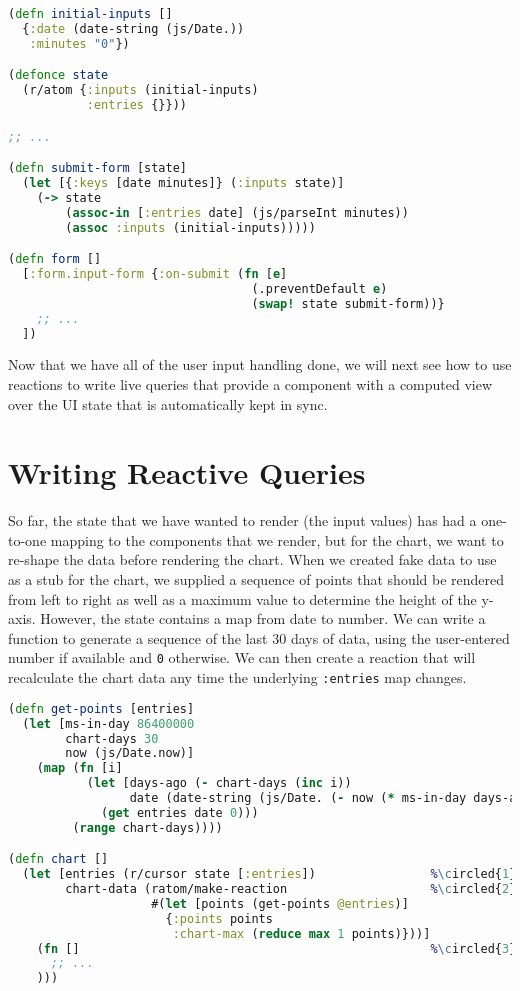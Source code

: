 \documentclass[10pt,twoside,openright]{memoir}
\newcommand*\circled[1]{\tikz[baseline=(char.base)]{
            \node[shape=circle,draw,inner sep=1pt] (char) {#1};}}
\begin{document}
\begin{lstlisting}[language=Clojure]
(defn initial-inputs []
  {:date (date-string (js/Date.))
   :minutes "0"})

(defonce state
  (r/atom {:inputs (initial-inputs)
           :entries {}}))

;; ...

(defn submit-form [state]
  (let [{:keys [date minutes]} (:inputs state)]
    (-> state
        (assoc-in [:entries date] (js/parseInt minutes))
        (assoc :inputs (initial-inputs)))))

(defn form []
  [:form.input-form {:on-submit (fn [e]
                                  (.preventDefault e)
                                  (swap! state submit-form))}
    ;; ...
  ])
\end{lstlisting}

Now that we have all of the user input handling done, we will next see
how to use reactions to write live queries that provide a component with
a computed view over the UI state that is automatically kept in sync.


\section{Writing Reactive Queries}

So far, the state that we have wanted to render (the input values) has
had a one-to-one mapping to the components that we render, but for the
chart, we want to re-shape the data before rendering the chart. When we
created fake data to use as a stub for the chart, we supplied a sequence
of points that should be rendered from left to right as well as a
maximum value to determine the height of the y-axis. However, the state
contains a map from date to number. We can write a function to generate
a sequence of the last 30 days of data, using the user-entered number if
available and \texttt{0} otherwise. We can then create a reaction that
will recalculate the chart data any time the underlying
\texttt{:entries} map changes.

\begin{lstlisting}[language=Clojure]
(defn get-points [entries]
  (let [ms-in-day 86400000
        chart-days 30
        now (js/Date.now)]
    (map (fn [i]
           (let [days-ago (- chart-days (inc i))
                 date (date-string (js/Date. (- now (* ms-in-day days-ago))))]
             (get entries date 0)))
         (range chart-days))))

(defn chart []
  (let [entries (r/cursor state [:entries])                %\circled{1}%
        chart-data (ratom/make-reaction                    %\circled{2}%
                    #(let [points (get-points @entries)]
                      {:points points
                       :chart-max (reduce max 1 points)}))]
    (fn []                                                 %\circled{3}%
      ;; ...
    )))
\end{lstlisting}
\end{document}
